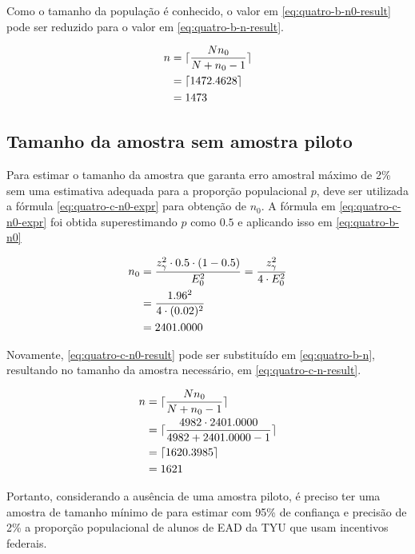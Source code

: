 	Como o tamanho da população é conhecido, o valor em
	\eqref{eq:quatro-b-n0-result} pode ser reduzido para o valor em
	\eqref{eq:quatro-b-n-result}.

	\begin{align}
		n &= \lceil \frac{N n_0}{N + n_0 - 1} \nonumber \rceil \\
		  &= \lceil 1472.4628 \nonumber \rceil \\
		  &= \label{eq:quatro-b-n-result} 1473
	\end{align}

\subsection{Tamanho da amostra sem amostra piloto}

	Para estimar o tamanho da amostra que garanta erro amostral máximo de
	2\% sem uma estimativa adequada para a proporção populacional $p$, deve
	ser utilizada a fórmula \eqref{eq:quatro-c-n0-expr} para obtenção de
	$n_0$. A fórmula em \eqref{eq:quatro-c-n0-expr} foi obtida
	superestimando $p$ como $0.5$ e aplicando isso em \eqref{eq:quatro-b-n0}

	\begin{align}
		n_0 &= \label{eq:quatro-c-n0-expr}
			   \frac{z_\gamma^2 \cdot 0.5 \cdot (1 - 0.5)}{E_0^2} = \frac{z_\gamma^2}{4 \cdot E_0^2} \\
			&= \frac{1.96^2}{4 \cdot (0.02)^2} \nonumber \\
			&= \label{eq:quatro-c-n0-result}
			   2401.0000
	\end{align}

	Novamente, \eqref{eq:quatro-c-n0-result} pode ser substituído em
	\eqref{eq:quatro-b-n}, resultando no tamanho da amostra necessário, em
	\eqref{eq:quatro-c-n-result}.

	\begin{align}
		n &= \lceil \frac{N n_0}{N + n_0 - 1} \nonumber \rceil \\
		  &= \lceil \frac{4982 \cdot 2401.0000}{4982 + 2401.0000 -1} \nonumber \rceil \\
		  &= \lceil 1620.3985 \nonumber \rceil \\
		  &= \label{eq:quatro-c-n-result} 
			 1621
	\end{align}

	Portanto, considerando a ausência de uma amostra piloto, é preciso ter
	uma amostra de tamanho mínimo de \QUATROCnceil para estimar com 95\% de
	confiança e precisão de 2\% a proporção populacional de alunos de EAD da
	TYU que usam incentivos federais.
